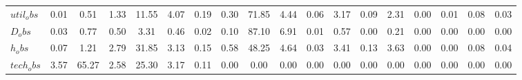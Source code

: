\begin{center}
\begin{longtable}{lccccccccccccccccc}
$util_obs     $	 & 	            0.01	 & 	            0.51	 & 	            1.33	 & 	           11.55	 & 	            4.07	 & 	            0.19	 & 	            0.30	 & 	           71.85	 & 	            4.44	 & 	            0.06	 & 	            3.17	 & 	            0.09	 & 	            2.31	 & 	            0.00	 & 	            0.01	 & 	            0.08	 & 	            0.03 \\ 
$D_obs        $	 & 	            0.03	 & 	            0.77	 & 	            0.50	 & 	            3.31	 & 	            0.46	 & 	            0.02	 & 	            0.10	 & 	           87.10	 & 	            6.91	 & 	            0.01	 & 	            0.57	 & 	            0.00	 & 	            0.21	 & 	            0.00	 & 	            0.00	 & 	            0.00	 & 	            0.00 \\ 
$h_obs        $	 & 	            0.07	 & 	            1.21	 & 	            2.79	 & 	           31.85	 & 	            3.13	 & 	            0.15	 & 	            0.58	 & 	           48.25	 & 	            4.64	 & 	            0.03	 & 	            3.41	 & 	            0.13	 & 	            3.63	 & 	            0.00	 & 	            0.00	 & 	            0.08	 & 	            0.04 \\ 
$tech_obs     $	 & 	            3.57	 & 	           65.27	 & 	            2.58	 & 	           25.30	 & 	            3.17	 & 	            0.11	 & 	            0.00	 & 	            0.00	 & 	            0.00	 & 	            0.00	 & 	            0.00	 & 	            0.00	 & 	            0.00	 & 	            0.00	 & 	            0.00	 & 	            0.00	 & 	            0.00 \\ 
\end{longtable}
 \end{center}
